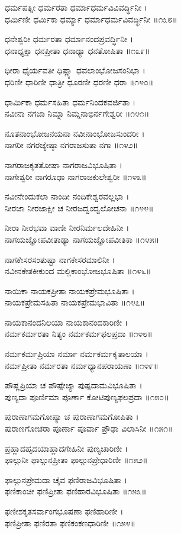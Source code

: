 ಧರ್ಮಪತ್ನೀ ಧರ್ಮರತಾ ಧರ್ಮಾಧರ್ಮವಿವಿವರ್ದ್ಧಿನೀ ।\\
ಧರ್ಮಿಣೀ ಧರ್ಮಿಕಾ ಧರ್ಮ್ಯಾ ಧರ್ಮಾಧರ್ಮವಿವರ್ದ್ಧಿನೀ ॥೧೩೮॥

ಧನೇಶ್ವರೀ ಧರ್ಮರತಾ ಧರ್ಮಾನಂದಪ್ರವರ್ದ್ಧಿನೀ ।\\
ಧನಾಧ್ಯಕ್ಷಾ ಧನಪ್ರೀತಾ ಧನಾಢ್ಯಾ ಧನತೋಷಿತಾ ॥೧೩೯॥

ಧೀರಾ ಧೈರ್ಯವತೀ ಧಿಷ್ಣ್ಯಾ ಧವಲಾಂಭೋಜಸಂನಿಭಾ ।\\
ಧರಿಣೀ ಧಾರಿಣೀ ಧಾತ್ರೀ ಧೂರಣೀ ಧರಣೀ ಧರಾ ॥೧೪೦॥

ಧಾರ್ಮಿಕಾ ಧರ್ಮಸಹಿತಾ ಧರ್ಮನಿಂದಕವರ್ಜಿತಾ ।\\
ನವೀನಾ ನಗಜಾ ನಿಮ್ನಾ ನಿಮ್ನನಾಭಿರ್ನಗೇಶ್ವರೀ ॥೧೪೧॥

ನೂತನಾಂಭೋಜನಯನಾ ನವೀನಾಂಭೋಜಸುಂದರೀ ।\\
ನಾಗರೀ ನಗರಜ್ಯೇಷ್ಠಾ ನಗರಾಜಸುತಾ ನಗಾ ॥೧೪೨॥

ನಾಗರಾಜಕೃತತೋಷಾ ನಾಗರಾಜವಿಭೂಷಿತಾ ।\\
ನಾಗೇಶ್ವರೀ ನಾಗರೂಢಾ ನಾಗರಾಜಕುಲೇಶ್ವರೀ ॥೧೪೩॥

ನವೀನೇಂದುಕಲಾ ನಾಂದೀ ನಂದಿಕೇಶ್ವರವಲ್ಲಭಾ ।\\
ನೀರಜಾ ನೀರಜಾಕ್ಷೀ ಚ ನೀರಜದ್ವಂದ್ವಲೋಚನಾ ॥೧೪೪॥

ನೀರಾ ನೀರಭವಾ ವಾಣೀ ನೀರನಿರ್ಮಲದೇಹಿನೀ ।\\
ನಾಗಯಜ್ಞೋಪವೀತಾಢ್ಯಾ ನಾಗಯಜ್ಞೋಪವೀತಿಕಾ ॥೧೪೫॥

ನಾಗಕೇಸರಸಂತುಷ್ಟಾ ನಾಗಕೇಸರಮಾಲಿನೀ ।\\
ನವೀನಕೇತಕೀಕುಂದ ಮಲ್ಲಿಕಾಂಭೋಜಭೂಷಿತಾ ॥೧೪೬॥

ನಾಯಿಕಾ ನಾಯಕಪ್ರೀತಾ ನಾಯಕಪ್ರೇಮಭೂಷಿತಾ ।\\
ನಾಯಕಪ್ರೇಮಸಹಿತಾ ನಾಯಕಪ್ರೇಮಭಾವಿತಾ ॥೧೪೭॥

ನಾಯಕಾನಂದನಿಲಯಾ ನಾಯಕಾನಂದಕಾರಿಣೀ ।\\
ನರ್ಮಕರ್ಮರತಾ ನಿತ್ಯಂ ನರ್ಮಕರ್ಮಫಲಪ್ರದಾ ॥೧೪೮॥

ನರ್ಮಕರ್ಮಪ್ರಿಯಾ ನರ್ಮಾ ನರ್ಮಕರ್ಮಕೃತಾಲಯಾ ।\\
ನರ್ಮಪ್ರೀತಾ ನರ್ಮರತಾ ನರ್ಮಧ್ಯಾನಪರಾಯಣಾ ॥೧೪೯॥

ಪೌಷ್ಣಪ್ರಿಯಾ ಚ ಪೌಷ್ಪೇಜ್ಯಾ ಪುಷ್ಪದಾಮವಿಭೂಷಿತಾ ।\\
ಪುಣ್ಯದಾ ಪೂರ್ಣಿಮಾ ಪೂರ್ಣಾ ಕೋಟಿಪುಣ್ಯಫಲಪ್ರದಾ ॥೧೫೦॥

ಪುರಾಣಾಗಮಗೋಪ್ಯಾ ಚ ಪುರಾಣಾಗಮಗೋಪಿತಾ ।\\
ಪುರಾಣಗೋಚರಾ ಪೂರ್ಣಾ ಪೂರ್ವಾ ಪ್ರೌಢಾ ವಿಲಾಸಿನೀ ॥೧೫೧॥

ಪ್ರಹ್ಲಾದಹೃದಯಾಹ್ಲಾದಗೇಹಿನೀ ಪುಣ್ಯಚಾರಿಣೀ ।\\
ಫಾಲ್ಗುನೀ ಫಾಲ್ಗುನಪ್ರೀತಾ ಫಾಲ್ಗುನಪ್ರೇಧಾರಿಣೀ ॥೧೫೨॥

ಫಾಲ್ಗುನಪ್ರೇಮದಾ ಚೈವ ಫಣಿರಾಜವಿಭೂಷಿತಾ ।\\
ಫಣಿಕಾಂಚೀ ಫಣಿಪ್ರೀತಾ ಫಣಿಹಾರವಿಭೂಷಿತಾ ॥೧೫೩॥

ಫಣೀಶಕೃತಸರ್ವಾಂಗಭೂಷಣಾ ಫಣಿಹಾರಿಣೀ ।\\
ಫಣಿಪ್ರೀತಾ ಫಣಿರತಾ ಫಣಿಕಂಕಣಧಾರಿಣೀ ॥೧೫೪॥


